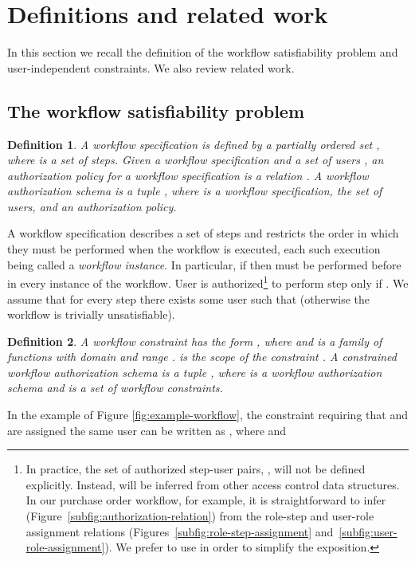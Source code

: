 \documentclass[jcs,crcready]{iosart1c}
\newtheorem{df}{Definition}
\begin{document}
\section{Definitions and related work}\label{sec:related-work}

In this section we recall the definition of the workflow satisfiability problem and user-independent constraints.
We also review related work.

\subsection{The workflow satisfiability problem}

\begin{df}\label{def:workflow}
A \emph{workflow specification} is defined by a partially ordered set , where  is a set of steps.
Given a workflow specification  and a set of users , an \emph{authorization policy} for a workflow specification is a relation .
A \emph{workflow authorization schema} is a tuple , where  is a workflow specification,  the set of users, and  an authorization policy.
\end{df}

A workflow specification describes a set of steps and restricts the order in which they must be performed when the workflow is executed, each such execution being called a \emph{workflow instance}.
In particular, if  then  must be performed before  in every instance of the workflow.
User  is authorized\footnote{In practice, the set of authorized step-user pairs, , will not be defined explicitly.
Instead,  will be inferred from other access control data structures.
In our purchase order workflow, for example, it is straightforward to infer  (Figure~\ref{subfig:authorization-relation}) from the role-step and user-role assignment relations (Figures~\ref{subfig:role-step-assignment} and~\ref{subfig:user-role-assignment}).
We prefer to use  in order to simplify the exposition.} to perform step  only if .
We assume that for every step  there exists some user  such that  (otherwise the workflow is trivially unsatisfiable).

\begin{df}
A \emph{workflow constraint} has the form , where  and  is a family of functions with domain  and range .
 is the \emph{scope} of the constraint .
A \emph{constrained workflow authorization schema} is a tuple , where  is a workflow authorization schema and  is a set of workflow constraints.
\end{df}
In the example of Figure \ref{fig:example-workflow}, the constraint requiring that  and  are assigned the same user can be written as , where  and  
\end{document}
